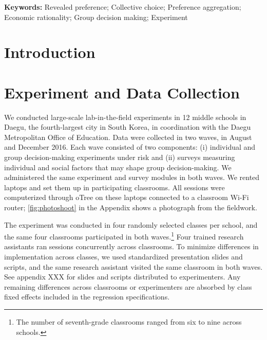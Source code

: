 \documentclass[11 pt]{article}
\begin{document}
\strut

\textbf{Keywords:} Revealed preference; Collective choice; Preference aggregation; Economic rationality; Group decision making; Experiment

\strut


\doublespacing %


\section{Introduction}
\label{sec:introduction}





\section{Experiment and Data Collection}
\label{sec:data_collection}

We conducted large-scale lab-in-the-field experiments in 12 middle schools in Daegu, the fourth-largest city in South Korea, in coordination with the Daegu Metropolitan Office of Education. Data were collected in two waves, in August  and December 2016. Each wave consisted of two components: (i) individual and group decision-making experiments under risk and (ii) surveys measuring individual and social factors that may shape group decision-making. We administered the same experiment and survey modules in both waves. We rented laptops and set them up in participating classrooms. All sessions were computerized through oTree \citep{Chenetal:2015:JBEF} on these laptops connected to a classroom Wi-Fi router; \autoref{fig:photoshoot} in the Appendix shows a photograph from the fieldwork.

The experiment was conducted in four randomly selected classes per school, and the same four classrooms participated in both waves.\footnote{The number of seventh-grade classrooms ranged from six to nine across schools.} Four trained research assistants ran sessions concurrently across classrooms. To minimize differences in implementation across classes, we used standardized presentation slides and scripts, and the same research assistant visited the same classroom in both waves. See appendix XXX for slides and scripts distributed to experimenters. Any remaining differences across classrooms or experimenters are absorbed by class fixed effects included in the regression specifications.
\end{document}
